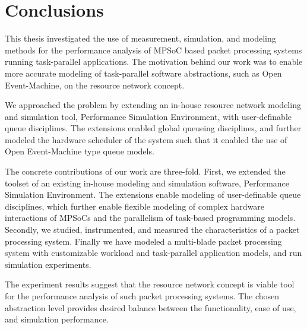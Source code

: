 \chapter{Conclusions}
\label{chapter:conclusions}

This thesis investigated the use of measurement, simulation, and modeling methods for the performance analysis of MPSoC based packet processing systems running task-parallel applications. The motivation behind our work was to enable more accurate modeling of task-parallel software abstractions, such as Open Event-Machine, on the resource network concept.

We approached the problem by extending an in-house resource network modeling and simulation tool, Performance Simulation Environment, with user-definable queue disciplines. The extensions enabled global queueing disciplines, and further modeled the hardware scheduler of the system such that it enabled the use of Open Event-Machine type queue models.

The concrete contributions of our work are three-fold. First, we extended the toolset of an existing in-house modeling and simulation software, Performance Simulation Environment. The extensions enable modeling of user-definable queue disciplines, which further enable flexible modeling of complex hardware interactions of MPSoCs and the parallelism of task-based programming models. Secondly, we studied, instrumented, and measured the characteristics of a packet processing system. Finally we have modeled a multi-blade packet processing system with customizable workload and task-parallel application models, and run simulation experiments.

The experiment results suggest that the resource network concept is viable tool for the performance analysis of such packet processing systems. The chosen abstraction level provides desired balance between the functionality, ease of use, and simulation performance.


